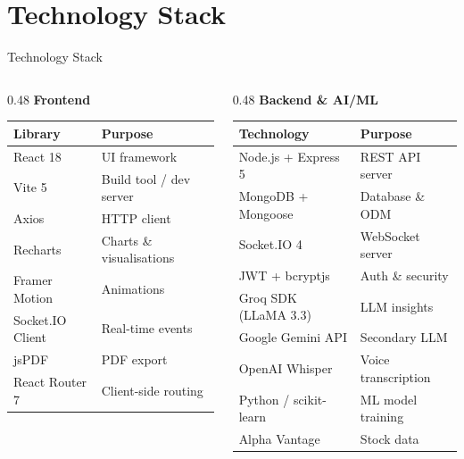 \documentclass[aspectratio=169, 11pt]{beamer}
\begin{document}
\section{Technology Stack}
\begin{frame}{Technology Stack}
  \begin{columns}[T]
    \begin{column}{0.48\textwidth}
      \textbf{Frontend}
      \vspace{4pt}
      \begin{tabularx}{\textwidth}{lX}
        \toprule
        \textbf{Library} & \textbf{Purpose} \\
        \midrule
        React 18 & UI framework \\
        Vite 5 & Build tool / dev server \\
        Axios & HTTP client \\
        Recharts & Charts \& visualisations \\
        Framer Motion & Animations \\
        Socket.IO Client & Real-time events \\
        jsPDF & PDF export \\
        React Router 7 & Client-side routing \\
        \bottomrule
      \end{tabularx}
    \end{column}
    \begin{column}{0.48\textwidth}
      \textbf{Backend \& AI/ML}
      \vspace{4pt}
      \begin{tabularx}{\textwidth}{lX}
        \toprule
        \textbf{Technology} & \textbf{Purpose} \\
        \midrule
        Node.js + Express 5 & REST API server \\
        MongoDB + Mongoose & Database \& ODM \\
        Socket.IO 4 & WebSocket server \\
        JWT + bcryptjs & Auth \& security \\
        Groq SDK (LLaMA 3.3) & LLM insights \\
        Google Gemini API & Secondary LLM \\
        OpenAI Whisper & Voice transcription \\
        Python / scikit-learn & ML model training \\
        Alpha Vantage & Stock data \\
        \bottomrule
      \end{tabularx}
    \end{column}
  \end{columns}
\end{frame}
\end{document}
